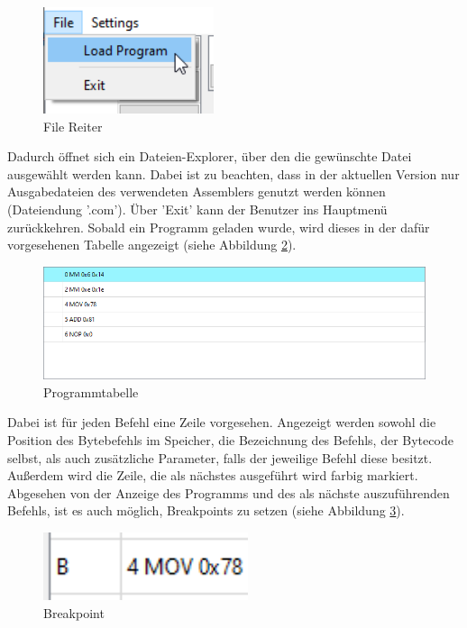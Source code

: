 \documentclass[12pt]{article}
\newcommand{\imgSpaceBefore}{\vspace{10pt}}
\begin{document}
\begin{figure}[H]
\centering
\includegraphics[width=5cm]{bilder/LoadFile}
\caption{File Reiter}
\label{fig:LoadFile}
\end{figure}

\noindent
Dadurch öffnet sich ein Dateien-Explorer, über den die gewünschte Datei ausgewählt werden kann. Dabei ist zu beachten, dass in der aktuellen Version nur Ausgabedateien des verwendeten Assemblers genutzt werden können (Dateiendung '.com'). Über 'Exit' kann der Benutzer ins Hauptmenü zurückkehren. Sobald ein Programm geladen wurde, wird dieses in der dafür vorgesehenen Tabelle angezeigt (siehe Abbildung \ref{fig:ProgTable}).\imgSpaceBefore

\begin{figure}[H]
\centering
\includegraphics[width=15cm]{bilder/Program_table}
\caption{Programmtabelle}
\label{fig:ProgTable}
\end{figure}

\noindent
Dabei ist für jeden Befehl eine Zeile vorgesehen. Angezeigt werden sowohl die Position des Bytebefehls im Speicher, die Bezeichnung des Befehls, der Bytecode selbst, als auch zusätzliche Parameter, falls der jeweilige Befehl diese besitzt. Außerdem wird die Zeile, die als nächstes ausgeführt wird farbig markiert. Abgesehen von der Anzeige des Programms und des als nächste auszuführenden Befehls, ist es auch möglich, Breakpoints zu setzen (siehe Abbildung \ref{fig:Break}).\imgSpaceBefore

\begin{figure}[h]
\centering
\includegraphics[width=6cm]{bilder/Breakpoint}
\caption{Breakpoint}
\label{fig:Break}
\end{figure}
\end{document}
